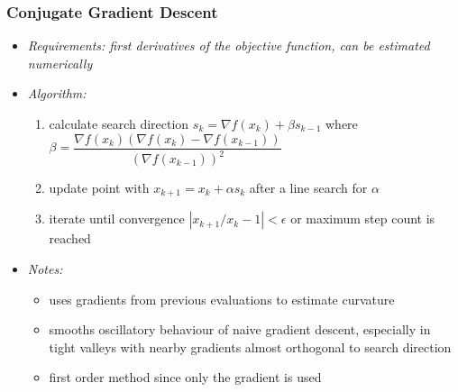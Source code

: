 	\begin{frame}
		\frametitle{Conjugate Gradient Descent}
		\begin{itemize}
			\item<2-> \itshape{Requirements:} first derivatives of the objective function, can be estimated numerically
			\item<3-> \itshape{Algorithm:}\vspace{-1.25ex}
				\begin{enumerate}
					\item<4-> calculate search direction $s_k = \nabla f(x_k) + \beta s_{k-1}$ where $\beta = \dfrac{\nabla f(x_k) \left(\nabla f(x_k) -
							  \nabla f(x_{k-1})\right)}{\left(\nabla f(x_{k-1})\right)^2}$\vspace{-1.25ex}
					\item<5-> update point with $x_{k+1} = x_k + \alpha s_k$ after a line search for $\alpha$\vspace{0.25ex}
					\item<6-> iterate until convergence $|x_{k+1} / x_k - 1| < \epsilon$ or maximum step count is reached
				\end{enumerate}
			\item<7-> \itshape{Notes:}
				\begin{itemize}
					\item<8-> uses gradients from previous evaluations to estimate curvature
					\item<9-> smooths oscillatory behaviour of naive gradient descent, especially in tight valleys with nearby
							  gradients almost orthogonal to search direction
					\item<10-> first order method since only the gradient is used
				\end{itemize}
		\end{itemize}
	\end{frame}

